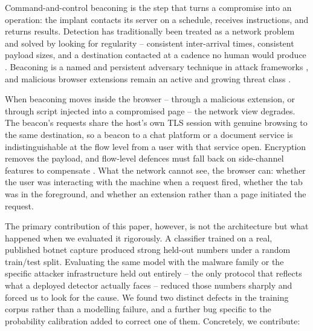 \documentclass[conference,a4paper]{IEEEtran}
\begin{document}
Command-and-control beaconing is the step that turns a compromise into an operation: the implant contacts its server on a schedule, receives instructions, and returns results. Detection has traditionally been treated as a network problem and solved by looking for regularity -- consistent inter-arrival times, consistent payload sizes, and a destination contacted at a cadence no human would produce \cite{garcia2014ctu13, gu2008botminer, bilge2012disclosure}. Beaconing is a named and persistent adversary technique in attack frameworks \cite{mitre2018attack}, and malicious browser extensions remain an active and growing threat class \cite{singh2025malicious}.

When beaconing moves inside the browser -- through a malicious extension, or through script injected into a compromised page -- the network view degrades. The beacon's requests share the host's own TLS session with genuine browsing to the same destination, so a beacon to a chat platform or a document service is indistinguishable at the flow level from a user with that service open. Encryption removes the payload, and flow-level defences must fall back on side-channel features to compensate \cite{anderson2016identifying}. What the network cannot see, the browser can: whether the user was interacting with the machine when a request fired, whether the tab was in the foreground, and whether an extension rather than a page initiated the request.

The primary contribution of this paper, however, is not the architecture but what happened when we evaluated it rigorously. A classifier trained on a real, published botnet capture produced strong held-out numbers under a random train/test split. Evaluating the same model with the malware family or the specific attacker infrastructure held out entirely -- the only protocol that reflects what a deployed detector actually faces -- reduced those numbers sharply and forced us to look for the cause. We found two distinct defects in the training corpus rather than a modelling failure, and a further bug specific to the probability calibration added to correct one of them. Concretely, we contribute:
\end{document}
